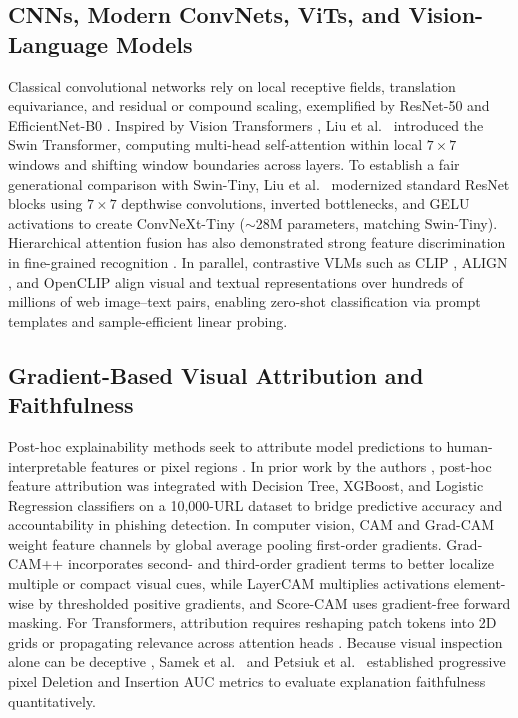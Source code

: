 \documentclass[final,5p,times,twocolumn]{elsarticle}
\begin{document}
\subsection{CNNs, Modern ConvNets, ViTs, and Vision-Language Models}
Classical convolutional networks rely on local receptive fields, translation equivariance, and residual or compound scaling, exemplified by ResNet-50 \cite{he2016deep} and EfficientNet-B0 \cite{tan2019efficientnet}. Inspired by Vision Transformers \cite{dosovitskiy2021an,touvron2021training}, Liu et al.\ \cite{liu2021swin} introduced the Swin Transformer, computing multi-head self-attention within local $7\times7$ windows and shifting window boundaries across layers. To establish a fair generational comparison with Swin-Tiny, Liu et al.\ \cite{liu2022convnet} modernized standard ResNet blocks using $7\times7$ depthwise convolutions, inverted bottlenecks, and GELU activations to create ConvNeXt-Tiny ($\sim$28M parameters, matching Swin-Tiny). Hierarchical attention fusion has also demonstrated strong feature discrimination in fine-grained recognition \cite{tao2024hierarchical}. In parallel, contrastive VLMs such as CLIP \cite{radford2021learning}, ALIGN \cite{jia2021scaling}, and OpenCLIP \cite{cherti2023reproducible} align visual and textual representations over hundreds of millions of web image--text pairs, enabling zero-shot classification via prompt templates \cite{zhou2022learning} and sample-efficient linear probing.

\subsection{Gradient-Based Visual Attribution and Faithfulness}
Post-hoc explainability methods seek to attribute model predictions to human-interpretable features or pixel regions \cite{ribeiro2016should,lundberg2017unified,sundararajan2017axiomatic,antamis2024interpretability}. In prior work by the authors \cite{tulla2025phishing}, post-hoc feature attribution was integrated with Decision Tree, XGBoost, and Logistic Regression classifiers on a 10,000-URL dataset to bridge predictive accuracy and accountability in phishing detection. In computer vision, CAM \cite{zhou2016learning} and Grad-CAM \cite{selvaraju2017grad} weight feature channels by global average pooling first-order gradients. Grad-CAM++ \cite{chattopadhay2018grad} incorporates second- and third-order gradient terms to better localize multiple or compact visual cues, while LayerCAM \cite{jiang2021layercam} multiplies activations element-wise by thresholded positive gradients, and Score-CAM \cite{wang2020score} uses gradient-free forward masking. For Transformers, attribution requires reshaping patch tokens into 2D grids or propagating relevance across attention heads \cite{abnar2020quantifying,chefer2021transformer}. Because visual inspection alone can be deceptive \cite{adebayo2018sanity}, Samek et al.\ \cite{samek2016evaluating} and Petsiuk et al.\ \cite{petsiuk2018rise} established progressive pixel Deletion and Insertion AUC metrics to evaluate explanation faithfulness quantitatively.
\end{document}
